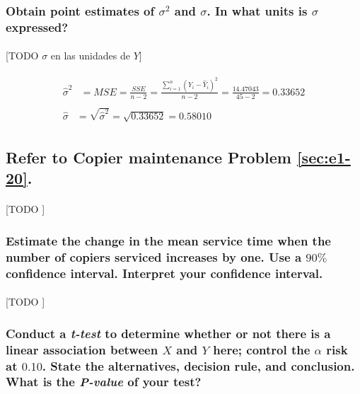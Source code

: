 \documentclass{article}
\begin{document}
      \subsubsection{Obtain point estimates of $\sigma^2$ and $\sigma$. In what units is $\sigma$ expressed?}

        \paragraph{}
        [TODO $\sigma$ en las unidades de $Y$]

        \begin{align}
          \begin{split}
            \widehat{\sigma}^2 &= MSE = \frac{SSE}{n-2} = \frac{\sum_{i=1}^n(Y_i - \widehat{Y}_i)^2}{n-2} = \frac{14.47043}{45-2} = 0.33652
          \end{split} \\
          \begin{split}
            \widehat{\sigma} &= \sqrt{\widehat{\sigma}^2} = \sqrt{0.33652} = 0.58010
          \end{split}
        \end{align}

    \setcounter{section}{2}
    \setcounter{subsection}{4}
    \subsection{Refer to \textbf{Copier maintenance} Problem \ref{sec:e1-20}.}

      \paragraph{}
      [TODO ]

      \subsubsection{Estimate the change in the mean service time when the number of copiers serviced increases by one. Use a $90\%$ confidence interval. Interpret your confidence interval.}
      \label{sec:copiers-2.5a}
        \paragraph{}
        [TODO ]

      \subsubsection{Conduct a \emph{t-test} to determine whether or not there is a linear association between $X$ and $Y$ here; control the $\alpha$ risk at $0.10$. State the alternatives, decision rule, and conclusion. What is the \emph{P-value} of your test?}
      \label{sec:copiers-2.5b}
\end{document}
